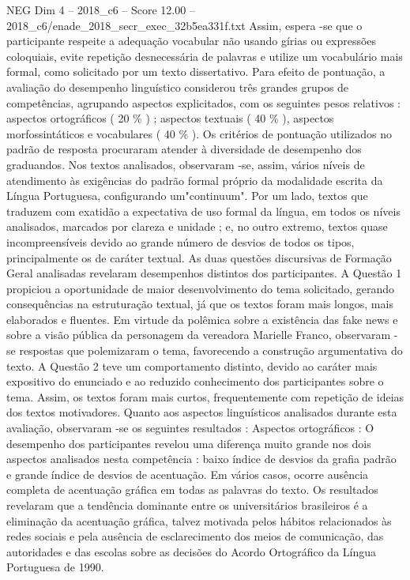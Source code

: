 \begin{textsample}{NEG Dim 4 – 2018\_c6 – Score 12.00 – 2018\_c6/enade\_2018\_secr\_exec\_32b5ea331f.txt}
Assim, espera -se que o participante respeite a adequação vocabular não usando gírias ou expressões coloquiais, evite repetição desnecessária de palavras e utilize um vocabulário mais formal, como solicitado por um texto dissertativo.
Para efeito de pontuação, a avaliação do desempenho linguístico considerou três grandes grupos de competências, agrupando aspectos explicitados, com os seguintes pesos relativos : aspectos ortográficos ( 20 \% ) ; aspectos textuais ( 40 \% ), aspectos morfossintáticos e vocabulares ( 40 \% ).
Os critérios de pontuação utilizados no padrão de resposta procuraram atender à diversidade de desempenho dos graduandos.
Nos textos analisados, observaram -se, assim, vários níveis de atendimento às exigências do padrão formal próprio da modalidade escrita da Língua Portuguesa, configurando um"continuum".
Por um lado, textos que traduzem com exatidão a expectativa de uso formal da língua, em todos os níveis analisados, marcados por clareza e unidade ; e, no outro extremo, textos quase incompreensíveis devido ao grande número de desvios de todos os tipos, principalmente os de caráter textual.
As duas questões discursivas de Formação Geral analisadas revelaram desempenhos distintos dos participantes.
A Questão 1 propiciou a oportunidade de maior desenvolvimento do tema solicitado, gerando consequências na estruturação textual, já que os textos foram mais longos, mais elaborados e fluentes.
Em virtude da polêmica sobre a existência das fake news e sobre a visão pública da personagem da vereadora Marielle Franco, observaram -se respostas que polemizaram o tema, favorecendo a construção argumentativa do texto.
A Questão 2 teve um comportamento distinto, devido ao caráter mais expositivo do enunciado e ao reduzido conhecimento dos participantes sobre o tema.
Assim, os textos foram mais curtos, frequentemente com repetição de ideias dos textos motivadores.
Quanto aos aspectos linguísticos analisados durante esta avaliação, observaram -se os seguintes resultados : Aspectos ortográficos : O desempenho dos participantes revelou uma diferença muito grande nos dois aspectos analisados nesta competência : baixo índice de desvios da grafia padrão e grande índice de desvios de acentuação.
Em vários casos, ocorre ausência completa de acentuação gráfica em todas as palavras do texto.
Os resultados revelaram que a tendência dominante entre os universitários brasileiros é a eliminação da acentuação gráfica, talvez motivada pelos hábitos relacionados às redes sociais e pela ausência de esclarecimento dos meios de comunicação, das autoridades e das escolas sobre as decisões do Acordo Ortográfico da Língua Portuguesa de 1990.

\end{textsample}
